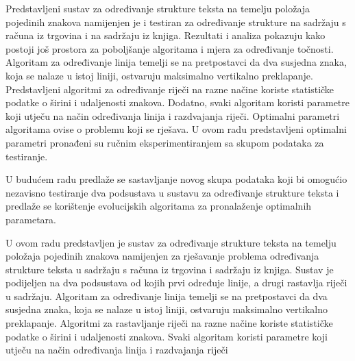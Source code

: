 \documentclass[times, utf8, zavrsni]{fer}
\begin{document}
Predstavljeni sustav za određivanje strukture teksta na temelju položaja
pojedinih znakova namijenjen je i testiran za određivanje strukture na sadržaju
s računa iz trgovina i na sadržaju iz knjiga. Rezultati i analiza pokazuju kako
postoji još prostora za poboljšanje algoritama i mjera za određivanje
točnosti. Algoritam za određivanje linija temelji se na pretpostavci da dva
susjedna znaka, koja se nalaze u istoj liniji, ostvaruju maksimalno vertikalno
preklapanje. Predstavljeni algoritmi za određivanje riječi na razne načine
koriste statističke podatke o širini i udaljenosti znakova. Dodatno,
svaki algoritam koristi parametre koji utječu na način određivanja linija i
razdvajanja riječi. Optimalni parametri algoritama ovise o problemu koji se
rješava. U ovom radu predstavljeni optimalni parametri pronađeni su ručnim
eksperimentiranjem sa skupom podataka za testiranje.

U budućem radu predlaže se sastavljanje novog skupa podataka koji bi omogućio
nezavisno testiranje dva podsustava u sustavu za određivanje strukture teksta i
predlaže se korištenje evolucijskih algoritama za pronalaženje optimalnih
parametara.




\begin{sazetak}
U ovom radu predstavljen je sustav za određivanje strukture teksta na temelju
položaja pojedinih znakova namijenjen za rješavanje problema određivanja
strukture teksta u sadržaju s računa iz trgovina i sadržaju iz knjiga. Sustav je
podijeljen na dva podsustava od kojih prvi određuje linije, a drugi rastavlja
riječi u sadržaju. Algoritam za određivanje linija temelji se na pretpostavci
da dva susjedna znaka, koja se nalaze u istoj liniji, ostvaruju maksimalno
vertikalno preklapanje. Algoritmi za rastavljanje riječi na razne načine
koriste statističke podatke o širini i udaljenosti znakova. Svaki algoritam
koristi parametre koji utječu na način određivanja linija i razdvajanja riječi


\end{sazetak}
\end{document}
